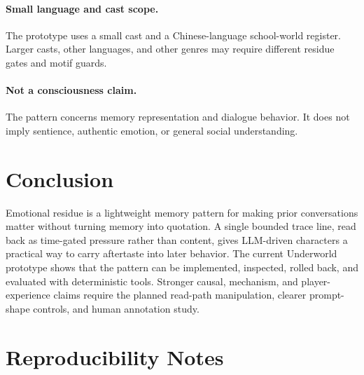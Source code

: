 \documentclass[11pt]{article}
\begin{document}
\paragraph{Small language and cast scope.}
The prototype uses a small cast and a Chinese-language school-world register. Larger casts, other languages, and other genres may require different residue gates and motif guards.

\paragraph{Not a consciousness claim.}
The pattern concerns memory representation and dialogue behavior. It does not imply sentience, authentic emotion, or general social understanding.

\section{Conclusion}

Emotional residue is a lightweight memory pattern for making prior conversations matter without turning memory into quotation. A single bounded trace line, read back as time-gated pressure rather than content, gives LLM-driven characters a practical way to carry aftertaste into later behavior. The current Underworld prototype shows that the pattern can be implemented, inspected, rolled back, and evaluated with deterministic tools. Stronger causal, mechanism, and player-experience claims require the planned read-path manipulation, clearer prompt-shape controls, and human annotation study.

\section*{Reproducibility Notes}
\end{document}
